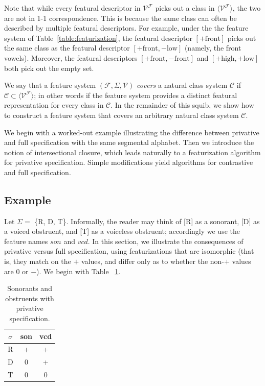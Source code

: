 \documentclass[11pt, oneside]{article}   	%
\begin{document}
Note that while every featural descriptor in $\mathcal V^\mathcal F$ picks out a class in $\langle \mathcal V^\mathcal F \rangle$, the two are not in 1-1 correspondence. This is because the same class can often be described by multiple featural descriptors. For example, under the the feature system of Table~\ref{table:featurization}, the featural descriptor $[+\text{front}]$ picks out the same class as the featural descriptor $[+ \text{front}, - \text{low}]$ (namely, the front vowels). Moreover, the featural descriptors $[+\text{front}, -\text{front}]$ and $[+\text{high}, +\text{low}]$ both pick out the empty set.

\vspace{\baselineskip} We say that a feature system $(\mathcal F, \Sigma, \mathcal V)$ \textit{covers} a natural class system $\mathcal C$ if $\mathcal C \subset \langle \mathcal V^\mathcal F \rangle$; in other words if the feature system provides a distinct featural representation for every class in $\mathcal C$. In the remainder of this squib, we show how to construct a feature system that covers an arbitrary natural class system $\mathcal C$.

We begin with a worked-out example illustrating the difference between privative and full specification with the same segmental alphabet. Then we introduce the notion of intersectional closure, which leads naturally to a featurization algorithm for privative specification. Simple modifications yield algorithms for contrastive and full specification.

\subsection{Example}

Let $\Sigma =$ \{R, D, T\}. Informally, the reader may think of [R] as a sonorant, [D] as a voiced obstruent, and [T] as a voiceless obstruent; accordingly we use the feature names $son$ and $vcd$. In this section, we illustrate the consequences of privative versus full specification, using featurizations that are isomorphic (that is, they match on the $+$ values, and differ only as to whether the non-$+$ values are $0$ or $-$). We begin with Table ~\ref{table:privative}.

\begin{table}[h]
    \centering
    \begin{tabular} {|c||c|c|}
    \hline
        $\sigma$ & son & vcd \\ \hline
        R & + & + \\
        D & 0 & + \\
        T & 0 & 0 \\
        \hline
    \end{tabular}
    \caption{Sonorants and obstruents with privative specification.}
    \label{table:privative}
\end{table}
\end{document}
